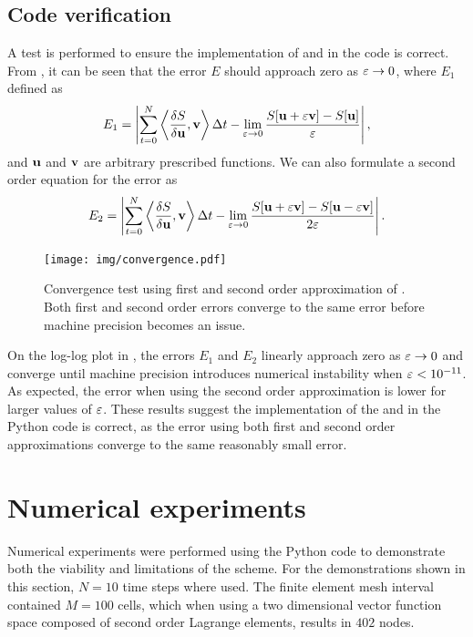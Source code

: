 \documentclass[a4paper, 12pt]{article}
\begin{document}
\subsection{Code verification}
A test is performed to ensure the implementation of 
and  in the code is correct. From , it can be seen that the
error $E$ should approach zero as $\varepsilon \rightarrow 0$, where $E_1$ defined as
\begin{equation}
  \label{eq:error_o1}
  E_1 = \left| \displaystyle \sum^{N}_{t=0} \left\langle \frac{\delta S}{\delta \mathbf{u}},\mathbf{v} \right\rangle\Delta
    t - \lim_{\varepsilon \rightarrow 0} 
  \frac{S[\mathbf{u} + \varepsilon \mathbf{v}] - S[\mathbf{u}]}{\varepsilon} \right|,
\end{equation}
and  $\mathbf{u}$ and $\mathbf{v}$ are arbitrary prescribed functions.
We can also formulate a second order equation for the error as
\begin{equation}
  \label{eq:test_2nd}
   E_2 = \left\vert \displaystyle \sum^{N}_{t=0} \left\langle \frac{\delta S}{\delta \mathbf{u}},\mathbf{v} \right\rangle\Delta t - \lim_{\varepsilon \rightarrow 0} 
  \frac{S[\mathbf{u} + \varepsilon \mathbf{v}] - S[\mathbf{u} - \varepsilon \mathbf{v}] }{2\varepsilon} \right\vert.
\end{equation}
\begin{figure}[H]
  \centering
  \texttt{[image: img/convergence.pdf]}
  \caption[Implementation convergence test results]{Convergence test using first and second order approximation of
    . Both first and second order errors converge to the same error
    before machine precision becomes an issue. }
  \label{fig:convergence}
\end{figure}

On the log-log plot in , the errors $E_1$ and $E_2$ linearly approach zero as $\varepsilon \rightarrow 0$
and converge until machine precision introduces numerical instability when $\varepsilon <
10^{-11}$. As expected, the error when using the second order approximation is
lower for larger values of $\varepsilon$.  These results suggest the
implementation of the  and  in the Python code is
correct, as the error using both first and second order approximations 
converge to the same reasonably small error.

\section{Numerical experiments\label{sec:experiments}}

Numerical experiments were performed using the Python code to demonstrate both the
viability and limitations of the scheme. For the demonstrations shown in this
section, $N = 10$ time steps where used. The finite element mesh interval
contained $M = 100$ cells, which when using a two dimensional vector function
space composed of second order Lagrange elements, results in $402$ nodes.
\end{document}

